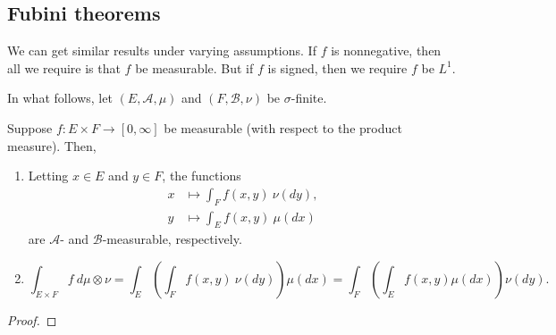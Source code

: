 \documentclass[12pt]{article}
\begin{document}

\subsection{Fubini theorems} %

We can get similar results under varying assumptions. If $f$ is nonnegative, then all we require is that $f$ be measurable. But if $f$ is signed, then we require $f$ be $L^1$.

In what follows, let $(E,\mathcal{A},\mu)$ and $(F,\mathcal{B},\nu)$ be $\sigma$-finite.

\begin{theorem}
\label{thm_fubini-tonelli}
	Suppose $f:E\times F\to [0,\infty]$ be measurable (with respect to the product measure). Then, 
	\begin{enumerate}
		\item Letting $x\in E$ and $y\in F$, the functions 
			\begin{align*}
				x &\mapsto \int_F f(x,y)\ \nu(dy), \\
				y &\mapsto \int_E f(x,y)\ \mu(dx)
			\end{align*}
			are $\mathcal{A}$- and $\mathcal{B}$-measurable, respectively.
		\item 
			\begin{equation*}
				\int_{E\times F} f\ d\mu\otimes\nu 
				= \int_E \left( \int_F f(x,y)\ \nu(dy) \right) \mu(dx)
				= \int_F \left( \int_E f(x,y) \mu(dx) \right) \nu(dy).
			\end{equation*}
	\end{enumerate}
\end{theorem}
\begin{proof}
\end{proof}
\end{document}
